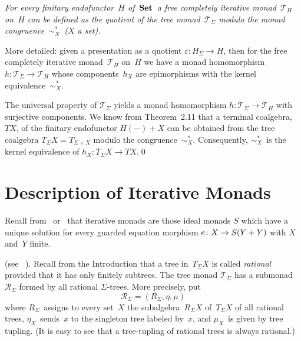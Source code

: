 \documentclass{entcs}
\newcommand{\Set}{\ensuremath{\St}}
\newcommand{\simxs}{\ensuremath{\mathrel{\sim_X^*}}}
\newcommand{\TT}{\ensuremath{\mathscr{T}}}
\newcommand{\RR}{\ensuremath{\mathscr{R}}}
\DeclareMathOperator{\St}{\textnormal{\textbf{Set}}}
\newenvironment{pv}[1]{\begin{trivlist}
\item[\hspace{\labelsep}\normalfont\bfseries#1]}%
{\end{trivlist}}
\begin{document}
\begin{pv}{3.4 Theorem}
\itshape
For every finitary endofunctor~$H$ of~\Set\ a free completely
iterative monad~$\TT_H$ on~$H$ can be defined as the quotient of the
tree monad~$\TT_\Sigma$ modulo the monad congruence~\simxs\
\textnormal{(}$X$ a set\textnormal{)}.
\end{pv}

\begin{pv}{Remark}
More detailed: given a presentation as a quotient $\varepsilon\colon
H_\Sigma\to H$, then for the free completely iterative monad~$\TT_H$
on~$H$ we have a monad homomorphism $h\colon\TT_\Sigma\to\TT_H$ whose
components~$h_X$ are epimorphisms with the kernel equivalence~\simxs.
\end{pv}

\begin{pf}
The universal property of $\TT_\Sigma$ yields a monad homomorphism
\linebreak
$h\colon\TT_\Sigma\to\TT_H                        $ with surjective components. We know from
Theorem~2.11 that a terminal coalgebra, $TX$, of the finitary
endofunctor $H({-})+X$ can be obtained from the
tree coalgebra $T_\Sigma X=T_{\Sigma+X}$ modulo the
congruence~\simxs. Consequently, \simxs~is the kernel equivalence
of $h_X\colon T_\Sigma X\to TX$.\qed
\end{pf}

\section{Description of Iterative Monads}
\begin{pv}{4.1}
Recall from~\cite{be} or~\cite{e} that iterative monads are those ideal
monads $S$ which have a unique solution for every guarded equation
morphism $e\colon X\to S(Y+\nolinebreak Y)$ with $X$ and~$Y$ finite.
\end{pv}

\begin{pv}{Example}
(see ~\cite{ebt}). Recall from the Introduction that a tree in~$T_\Sigma X$ is called
\textit{rational} provided that it has only finitely subtrees.
The tree monad $\TT_\Sigma$ has a submonad~$\RR_\Sigma$
formed by all rational $\Sigma$-trees. More precisely, put
\[\RR_\Sigma=(R_\Sigma,\eta,\mu)\]
where $R_\Sigma$~assigns to every set~$X$ the subalgebra~$R_\Sigma
X$ of~$T_\Sigma X$ of all rational trees, $\eta_X$~sends~$x$ to the
singleton tree labeled by~$x$, and $\mu_X$~is given by tree tupling.
(It is easy to see that a tree-tupling of rational trees is always
rational.)
\end{pv}
\end{document}
